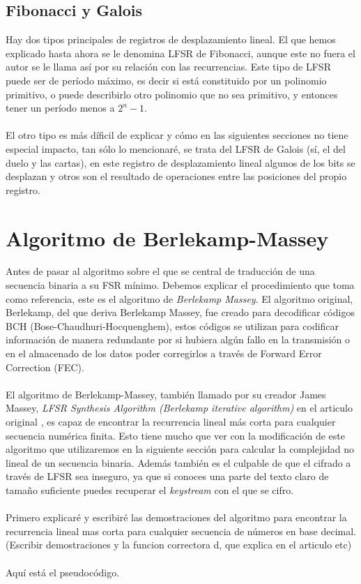 \subsection{Fibonacci y Galois}
Hay dos tipos principales de registros de desplazamiento lineal. El que hemos explicado hasta ahora se le denomina LFSR de Fibonacci, aunque este no fuera el autor se le llama así por su relación con las recurrencias. Este tipo de LFSR puede ser de período máximo, es decir si está constituido por un polinomio primitivo, o puede describirlo otro polinomio que no sea primitivo, y entonces tener un período menos a $2^n - 1$. \\\\
El otro tipo es más díficil de explicar y cómo en las siguientes secciones no tiene especial impacto, tan sólo lo mencionaré, se trata del LFSR de Galois (sí, el del duelo y las cartas), en este registro de desplazamiento lineal algunos de los bits se desplazan y otros son el resultado de operaciones entre las posiciones del propio registro.
\\




\section{Algoritmo de Berlekamp-Massey}
Antes de pasar al algoritmo sobre el que se central de traducción de una secuencia binaria a su FSR mínimo. Debemos explicar el procedimiento que toma como referencia, este es el algoritmo de \textit{Berlekamp Massey}. El algoritmo original, Berlekamp, del que deriva Berlekamp Massey, fue creado para decodificar códigos BCH (Bose-Chaudhuri-Hocquenghem), estos códigos se utilizan para codificar información de manera redundante por si hubiera algún fallo en la transmisión o en el almacenado de los datos poder corregirlos a través de Forward Error Correction (FEC). \\\\
El algoritmo de Berlekamp-Massey, también llamado por su creador James Massey, \textit{LFSR Synthesis Algorithm (Berlekamp iterative algorithm)} en el articulo original \cite{massey1969shift}, es capaz de encontrar la recurrencia lineal más corta para cualquier secuencia numérica finita. Esto tiene mucho que ver con la modificación de este algoritmo que utilizaremos en la siguiente sección para calcular la complejidad no lineal de un secuencia binaria. Además también es el culpable de que el cifrado a través de LFSR sea inseguro, ya que si conoces una parte del texto claro de tamaño suficiente puedes recuperar el \textit{keystream} con el que se cifro.\\\\
Primero explicaré y escribiré las demostraciones del algoritmo para encontrar la recurrencia lineal mas corta para cualquier secuencia de números en base decimal.\\
(Escribir demostraciones y la funcion correctora d, que explica en el articulo etc)
\\\\
Aquí está el pseudocódigo.



